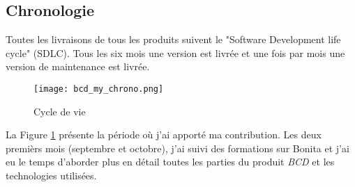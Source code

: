 \subsection{Chronologie}
Toutes les livraisons de tous les produits suivent le "Software Development life cycle" (SDLC). Tous les six mois une version est livrée et une fois par mois une version de maintenance est livrée.

\begin{figure}[!ht]
\centering
\texttt{[image: bcd\_my\_chrono.png]}
\caption{Cycle de vie}
\label{bcd_my_chrono}
\end{figure}

La Figure \ref{bcd_my_chrono} présente la période où j'ai apporté ma contribution. Les deux premièrs mois (septembre et octobre), j'ai suivi des formations sur Bonita et j'ai eu le temps d’aborder plus en détail toutes les parties du produit \emph{BCD} et les technologies utilisées.
